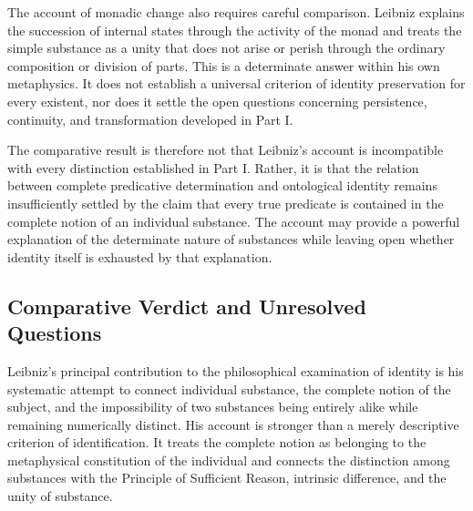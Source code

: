 \label{para:VS.B01.P01.C08.S07.SS10.P004}

The account of monadic change also requires
careful comparison. Leibniz explains the
succession of internal states through
the activity of the monad and treats the
simple substance as a unity that does
not arise or perish through the ordinary
composition or division of parts. This
is a determinate answer within his own
metaphysics. It does not establish a
universal criterion of identity preservation
for every existent, nor does it settle
the open questions concerning persistence,
continuity, and transformation developed
in Part I. \cite[§§4--7, 10--15]{LeibnizMonadology}

\label{para:VS.B01.P01.C08.S07.SS10.P005}

The comparative result is therefore not
that Leibniz's account is incompatible
with every distinction established in
Part I. Rather, it is that the relation
between complete predicative determination
and ontological identity remains insufficiently
settled by the claim that every true
predicate is contained in the complete
notion of an individual substance. The
account may provide a powerful explanation
of the determinate nature of substances
while leaving open whether identity itself
is exhausted by that explanation.



\subsection{Comparative Verdict and Unresolved Questions}
\label{subsec:ch08-leibniz-verdict}

\label{para:VS.B01.P01.C08.S07.SS11.P001}

Leibniz's principal contribution to the
philosophical examination of identity is
his systematic attempt to connect individual
substance, the complete notion of the subject,
and the impossibility of two substances
being entirely alike while remaining
numerically distinct. His account is
stronger than a merely descriptive criterion
of identification. It treats the complete
notion as belonging to the metaphysical
constitution of the individual and connects
the distinction among substances with
the Principle of Sufficient Reason,
intrinsic difference, and the unity
of substance.

